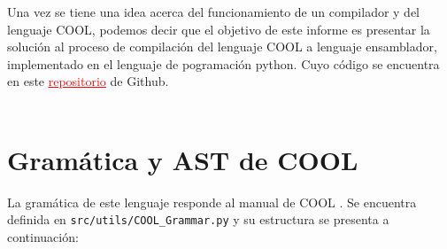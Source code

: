 \documentclass[twoside]{article}
\begin{document}
Una vez se tiene una idea acerca del funcionamiento de un compilador y del lenguaje COOL, podemos decir que el objetivo de este informe es presentar la soluci\'on al proceso de compilaci\'on del lenguaje COOL a lenguaje ensamblador, implementado en el lenguaje de pogramaci\'on python. Cuyo c\'odigo se encuentra en este \href{https://github.com/BeginnerCompilers/cool-compiler-2021}{\textcolor{red}{\underline{repositorio}}} de Github.\\\\

\section{Gram\'atica y AST de COOL}
La gram\'atica de este lenguaje responde al manual de COOL \cite{cool}. Se encuentra definida en \texttt{src/utils/COOL\_Grammar.py} y su estructura se presenta a continuaci\'on:\\
\end{document}
